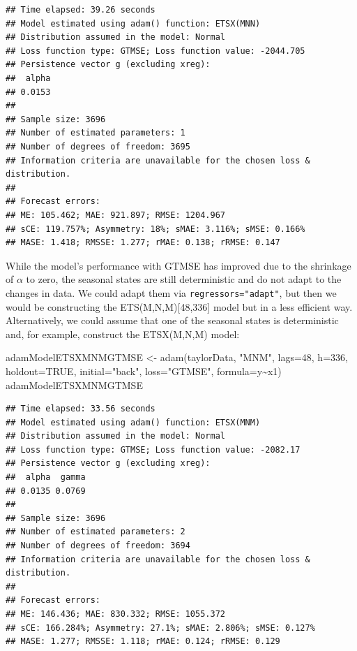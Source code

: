 \documentclass[
]{book}
\newenvironment{Shaded}{\begin{snugshade}}{\end{snugshade}}
\newcommand{\AttributeTok}[1]{\textcolor[rgb]{0.77,0.63,0.00}{#1}}
\newcommand{\ConstantTok}[1]{\textcolor[rgb]{0.00,0.00,0.00}{#1}}
\newcommand{\DecValTok}[1]{\textcolor[rgb]{0.00,0.00,0.81}{#1}}
\newcommand{\FunctionTok}[1]{\textcolor[rgb]{0.00,0.00,0.00}{#1}}
\newcommand{\NormalTok}[1]{#1}
\newcommand{\OtherTok}[1]{\textcolor[rgb]{0.56,0.35,0.01}{#1}}
\newcommand{\SpecialCharTok}[1]{\textcolor[rgb]{0.00,0.00,0.00}{#1}}
\newcommand{\StringTok}[1]{\textcolor[rgb]{0.31,0.60,0.02}{#1}}
\theoremstyle{definition}
\theoremstyle{definition}
\theoremstyle{definition}
\theoremstyle{definition}
\theoremstyle{remark}
\begin{document}
\begin{verbatim}
## Time elapsed: 39.26 seconds
## Model estimated using adam() function: ETSX(MNN)
## Distribution assumed in the model: Normal
## Loss function type: GTMSE; Loss function value: -2044.705
## Persistence vector g (excluding xreg):
##  alpha 
## 0.0153 
## 
## Sample size: 3696
## Number of estimated parameters: 1
## Number of degrees of freedom: 3695
## Information criteria are unavailable for the chosen loss & distribution.
## 
## Forecast errors:
## ME: 105.462; MAE: 921.897; RMSE: 1204.967
## sCE: 119.757%; Asymmetry: 18%; sMAE: 3.116%; sMSE: 0.166%
## MASE: 1.418; RMSSE: 1.277; rMAE: 0.138; rRMSE: 0.147
\end{verbatim}

While the model's performance with GTMSE has improved due to the shrinkage of \(\alpha\) to zero, the seasonal states are still deterministic and do not adapt to the changes in data. We could adapt them via \texttt{regressors="adapt"}, but then we would be constructing the ETS(M,N,M){[}48,336{]} model but in a less efficient way. Alternatively, we could assume that one of the seasonal states is deterministic and, for example, construct the ETSX(M,N,M) model:

\begin{Shaded}
\begin{Highlighting}[]
\NormalTok{adamModelETSXMNMGTMSE }\OtherTok{\textless{}{-}} \FunctionTok{adam}\NormalTok{(taylorData, }\StringTok{"MNM"}\NormalTok{, }\AttributeTok{lags=}\DecValTok{48}\NormalTok{,}
                              \AttributeTok{h=}\DecValTok{336}\NormalTok{, }\AttributeTok{holdout=}\ConstantTok{TRUE}\NormalTok{,}
                              \AttributeTok{initial=}\StringTok{"back"}\NormalTok{, }\AttributeTok{loss=}\StringTok{"GTMSE"}\NormalTok{,}
                              \AttributeTok{formula=}\NormalTok{y}\SpecialCharTok{\textasciitilde{}}\NormalTok{x1)}
\NormalTok{adamModelETSXMNMGTMSE}
\end{Highlighting}
\end{Shaded}

\begin{verbatim}
## Time elapsed: 33.56 seconds
## Model estimated using adam() function: ETSX(MNM)
## Distribution assumed in the model: Normal
## Loss function type: GTMSE; Loss function value: -2082.17
## Persistence vector g (excluding xreg):
##  alpha  gamma 
## 0.0135 0.0769 
## 
## Sample size: 3696
## Number of estimated parameters: 2
## Number of degrees of freedom: 3694
## Information criteria are unavailable for the chosen loss & distribution.
## 
## Forecast errors:
## ME: 146.436; MAE: 830.332; RMSE: 1055.372
## sCE: 166.284%; Asymmetry: 27.1%; sMAE: 2.806%; sMSE: 0.127%
## MASE: 1.277; RMSSE: 1.118; rMAE: 0.124; rRMSE: 0.129
\end{verbatim}
\end{document}

